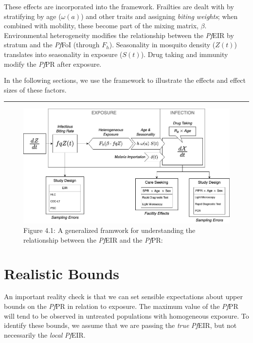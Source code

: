 \documentclass[
]{book}
\begin{document}
These effects are incorporated into the framework. Frailties are dealt with by stratifying by age (\(\omega(a)\)) and other traits and assigning \emph{biting weights}; when combined with mobility, these become part of the mixing matrix, \(\beta\). Environmental heterogeneity modifies the relationship between the \emph{Pf}EIR by stratum and the \emph{Pf}FoI (through \(F_h\)). Seasonality in mosquito density (\(Z(t)\)) translates into seasonality in exposure (\(S(t)\)). Drug taking and immunity modify the \emph{Pf}PR after exposure.

In the following sections, we use the framework to illustrate the effects and effect sizes of these factors.

\begin{center}\rule{0.5\linewidth}{0.5pt}\end{center}

\begin{figure}
\centering
\includegraphics{./Figures/Estimation.png}
\caption{Figure 4.1: A generalized framwork for understanding the relationship between the \emph{Pf}EIR and the \emph{Pf}PR:}
\end{figure}

\hypertarget{realistic-bounds}{%
\section{Realistic Bounds}\label{realistic-bounds}}

An important reality check is that we can set sensible expectations about upper bounds on the \emph{Pf}PR in relation to exposure. The maximum value of the \emph{Pf}PR will tend to be observed in untreated populations with homogeneous exposure. To identify these bounds, we assume that we are passing the \emph{true} \emph{Pf}EIR, but not necessarily the \emph{local} \emph{Pf}EIR.
\end{document}
